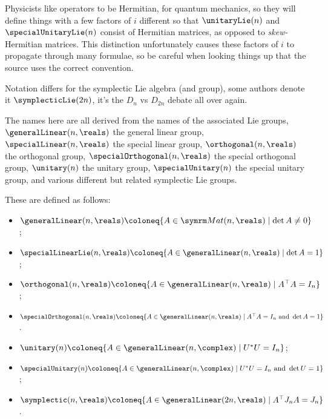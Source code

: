 \documentclass[fleqn]{NotesClass}
\newcommand{\trans}{{\top}}
\newcommand{\hermit}{*}
\begin{document}
    \begin{wrn}
        Physicists like operators to be Hermitian, for quantum mechanics, so they will define things with a few factors of \(i\) different so that \(\unitaryLie(n)\) and \(\specialUnitaryLie(n)\) consist of Hermitian matrices, as opposed to \emph{skew-}Hermitian matrices.
        This distinction unfortunately causes these factors of \(i\) to propagate through many formulae, so be careful when looking things up that the source uses the correct convention.
    \end{wrn}
    
    \begin{wrn}
        Notation differs for the symplectic Lie algebra (and group), some authors denote it \(\symplecticLie(2n)\), it's the \(D_n\) vs \(D_{2n}\) debate all over again.
    \end{wrn}
    
    The names here are all derived from the names of the associated Lie groups, \(\generalLinear(n, \reals)\) the general linear group, \(\specialLinear(n, \reals)\) the special linear group, \(\orthogonal(n, \reals)\) the orthogonal group, \(\specialOrthogonal(n, \reals)\) the special orthogonal group, \(\unitary(n)\) the unitary group, \(\specialUnitary(n)\) the special unitary group, and various different but related symplectic Lie groups.
    
    These are defined as follows:
    \begin{itemize}
        \item \(\generalLinear(n, \reals) \coloneq \{A \in \matrices{n}{\reals} \mid \det A \ne 0\}\);
        \item \(\specialLinearLie(n, \reals) \coloneq \{A \in \generalLinear(n, \reals) \mid \det A = 1\}\);
        \item \(\orthogonal(n, \reals) \coloneq \{A \in \generalLinear(n, \reals) \mid A^{\trans}A = I_n\}\);
        \item \(\specialOrthogonal(n, \reals) \coloneq \{A \in \generalLinear(n, \reals) \mid A^{\trans}A = I_n \text{ and } \det A = 1\}\).
        \item \(\unitary(n) \coloneq \{A \in \generalLinear(n, \complex) \mid U^{\hermit} U = I_n\}\);
        \item \(\specialUnitary(n) \coloneq \{A \in \generalLinear(n, \complex) \mid U^{\hermit}U = I_n \text{ and } \det U = 1\}\);
        \item \(\symplectic(n, \reals) \coloneq \{A \in \generalLinear(2n, \reals) \mid A^{\trans}J_nA = J_n\}\).
    \end{itemize}
    
\end{document}
